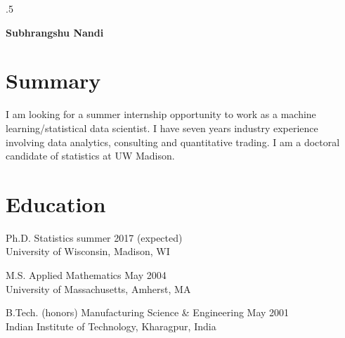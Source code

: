 \documentclass[11pt]{res} %
\begin{document}
 
\thispagestyle{empty} %

\moveleft.5\hoffset\centerline{\large\bf Subhrangshu Nandi}
\address{1300 University Ave, Suite 1250D \\   Madison, WI 53706  \\ (413) 530-1400}
\address{snandi@wisc.edu \\ nands31@gmail.com  \\ www.linkedin.com/in/nands31}
                                             
\begin{resume}
 
\section{Summary}
I am looking for a summer internship opportunity to work as a machine learning/statistical data scientist. I have seven years industry experience involving data analytics, consulting and quantitative trading. I am a doctoral candidate of statistics at UW Madison.

\section{Education} 
Ph.D. Statistics \hfill summer 2017 (expected)\\
\noindent University of Wisconsin, Madison, WI

M.S. Applied Mathematics \hfill May 2004 \\
\noindent University of Massachusetts, Amherst, MA

B.Tech. (honors) Manufacturing Science \& Engineering \hfill May 2001 \\
\noindent Indian Institute of Technology, Kharagpur, India


\end{resume}
\end{document}
